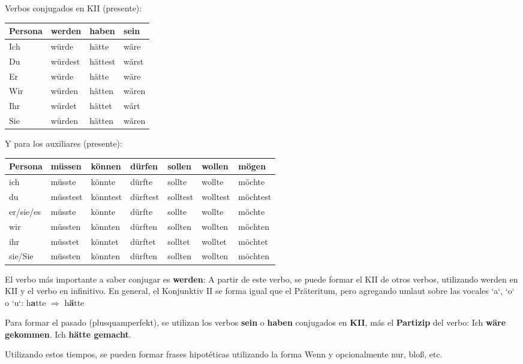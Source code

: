 Verbos conjugados en KII (presente):

\begin{tabular}{|l|l|l|l|}
\hline
\textbf{Persona} & \textbf{werden} & \textbf{haben} & \textbf{sein} \\
\hline
Ich & würde & hätte & wäre \\
Du  & würdest & hättest & wärst \\
Er  & würde & hätte & wäre  \\
Wir & würden & hätten & wären \\
Ihr & würdet & hättet & wärt \\
Sie & würden & hätten & wären \\
\hline
\end{tabular}

Y para los auxiliares (presente):

\begin{tabular}{| l | l | l | l | l | l | l |}
\hline
\textbf{Persona} & \textbf{müssen} & \textbf{können} & \textbf{dürfen} & \textbf{sollen} &\textbf{wollen} & \textbf{mögen}\\
\hline
ich & müsste & könnte & dürfte & sollte & wollte & möchte \\
du & müsstest & könntest & dürftest & solltest & wolltest & möchtest\\
er/sie/es & müsste & könnte & dürfte & sollte & wollte  & möchte \\
wir & müssten & könnten  & dürften & sollten & wollten & möchten \\
ihr  & müsstet & könntet & dürftet & solltet & wolltet & möchtet \\
sie/Sie & müssten & könnten & dürften & sollten & wollten & möchten \\
\hline
\end{tabular}

El verbo más importante a saber conjugar es \textbf{werden}: A partir de este verbo, se puede formar el KII de otros verbos, utilizando werden en KII y el verbo en infinitivo. En general, el Konjunktiv II se forma igual que el Präteritum, pero agregando umlaut sobre las vocales `a`, `o` o `u`: h\textbf{a}tte $\Rightarrow$ h\textbf{ä}tte

Para formar el pasado (plusquamperfekt), se utilizan los verbos \textbf{sein} o \textbf{haben} conjugados en \textbf{KII}, más el \textbf{Partizip} del verbo: Ich \textbf{wäre gekommen}. Ich \textbf{hätte gemacht}.

Utilizando estos tiempos, se pueden formar frases hipotéticas utilizando la forma Wenn y opcionalmente nur, bloß, etc.

